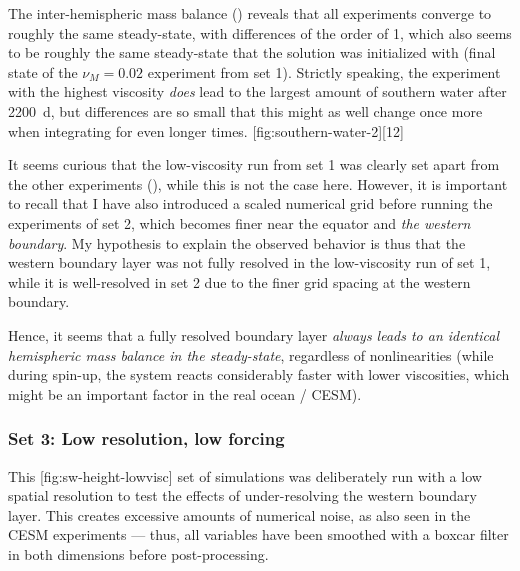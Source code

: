 The inter-hemispheric mass balance () reveals that all experiments converge to roughly the same steady-state, with differences of the order of \SI{1}{\permille}, which also seems to be roughly the same steady-state that the solution was initialized with (final state of the \(\nu_M=0.02\) experiment from set 1). Strictly speaking, the experiment with the highest viscosity \emph{does} lead to the largest amount of southern water after \SI{2200}{\day}, but differences are so small that this might as well change once more when integrating for even longer times.
[fig:southern-water-2]{}[12]

It seems curious that the low-viscosity run from set 1 was clearly set apart from the other experiments (), while this is not the case here. However, it is important to recall that I have also introduced a scaled numerical grid before running the experiments of set 2, which becomes finer near the equator and \emph{the western boundary}. My hypothesis to explain the observed behavior is thus that the western boundary layer was not fully resolved in the low-viscosity run of set 1, while it is well-resolved in set 2 due to the finer grid spacing at the western boundary.

Hence, it seems that a fully resolved boundary layer \emph{always leads to an identical hemispheric mass balance in the steady-state}, regardless of nonlinearities (while during spin-up, the system reacts considerably faster with lower viscosities, which might be an important factor in the real ocean / \ac{CESM}).

\clearpage
\FloatBlock
\subsubsection{Set 3: Low resolution, low forcing}

This%
[fig:sw-height-lowvisc]{}%
%
set of simulations was deliberately run with a low spatial resolution to test the effects of under-resolving the western boundary layer. This creates excessive amounts of numerical noise, as also seen in the \ac{CESM} experiments --- thus, all variables have been smoothed with a boxcar filter in both dimensions before post-processing. 

